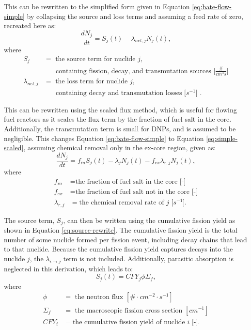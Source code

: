 This can be rewritten to the simplified form given in Equation \eqref{eq:bate-flow-simple} by collapsing the source and loss terms and assuming a feed rate of zero, recreated here as:
\begin{equation}
    \frac{dN_j}{dt} = S_j(t) - \lambda_{net, j} N_j(t), \nonumber
\end{equation}
where
\begin{align}
S_j &= \mbox{ the source term for nuclide $j$, } \nonumber\\
& \;\;\;\;\; \mbox{ containing fission, decay, and transmutation sources [$\frac{\#}{cm^3 s}$]} \nonumber \\
\lambda_{net, j} &= \mbox{ the loss term for nuclide $j$,} \nonumber\\
& \;\;\;\;\; \mbox{ containing decay and transmutation losses [$s^{-1}$] .} \nonumber
\end{align}

This can be rewritten using the scaled flux method, which is useful for flowing fuel reactors as it scales the flux term by the fraction of fuel salt in the core.
Additionally, the transmutation term is small for \glspl{DNP}, and is assumed to be negligible.
This changes Equation \eqref{eq:bate-flow-simple} to Equation \eqref{eq:simple-scaled}, assuming chemical removal only in the ex-core region, given as:
\begin{equation}
    \frac{dN_j}{dt} = f_{in} S_j(t) - \lambda_{j} N_j(t) - f_{ex} \lambda_{r, j}N_j(t),
    \label{eq:simple-scaled}
\end{equation}
where
\begin{align}
    f_{in} &= \text{the fraction of fuel salt in the core [-]} \nonumber \\
    f_{ex} &= \text{the fraction of fuel salt not in the core [-]} \nonumber \\
    \lambda_{r, j} &= \text{the chemical removal rate of $j$ [$s^{-1}$].} \nonumber
\end{align}

The source term, $S_j$, can then be written using the cumulative fission yield as shown in Equation \eqref{eq:source-rewrite}.
The cumulative fission yield is the total number of some nuclide formed per fission event, including decay chains that lead to that nuclide.
Because the cumulative fission yield captures decays into the nuclide $j$, the $\lambda_{i \rightarrow j}$ term is not included.
Additionally, parasitic absorption is neglected in this derivation, which leads to:
\begin{equation}
    S_j(t) = CFY_j \phi \Sigma_f,
    \label{eq:source-rewrite}
\end{equation}
where
\begin{align}
    \phi &= \text{ the neutron flux $[\# \cdot cm^{-2} \cdot s^{-1}]$} \nonumber \\
    \Sigma_f &= \text{ the macroscopic fission cross section $[cm^{-1}]$} \nonumber \\
    CFY_i &= \text{the cumulative fission yield of nuclide $i$ [-]}. \nonumber
\end{align}

